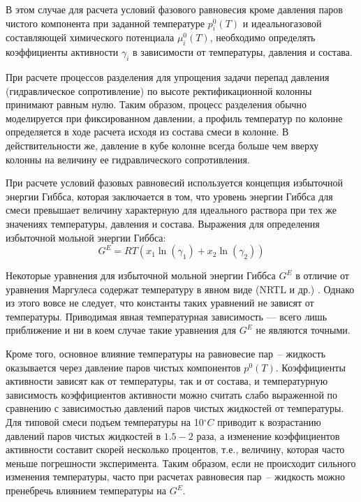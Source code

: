 В этом случае для расчета условий фазового равновесия кроме давления паров чистого компонента при заданной температуре $p_i^0(T)$ и идеальногазовой составляющей химического потенциала $\mu_i^0(T)$, необходимо определять коэффициенты активности $\gamma_i$ в зависимости от температуры, давления и состава.

При расчете процессов разделения для упрощения задачи перепад давления (гидравлическое сопротивление) по высоте ректификационной колонны принимают равным нулю. Таким образом, процесс разделения обычно моделируется при фиксированном давлении, а профиль температур по колонне определяется в ходе расчета исходя из состава смеси в колонне. В действительности же, давление в кубе колонне всегда больше чем вверху колонны на величину ее гидравлического сопротивления. 

При расчете условий фазовых равновесий используется концепция избыточной энергии Гиббса, которая заключается в том, что уровень энергии Гиббса для смеси превышает величину характерную для идеального раствора при тех же значениях температуры, давления и состава. Выражения для определения избыточной мольной энергии Гиббса:
\begin{equation}
	G^E=RT(x_1\ln (\gamma_1) +x_2 \ln(\gamma_2))
\end{equation}

Некоторые уравнения для избыточной мольной энергии Гиббса $G^E$ в отличие от уравнения Маргулеса содержат температуру в явном виде (NRTL и др.) \cite{rid1982,yelles1989}. Однако из этого вовсе не следует, что константы таких уравнений не зависят от температуры. Приводимая явная температурная зависимость --- всего лишь приближение и ни в коем случае такие уравнения для $G^E$ не являются точными.

Кроме того, основное влияние температуры на равновесие пар~-- жидкость оказывается через давление паров чистых компонентов $p^0(T)$. Коэффициенты активности зависят как от температуры, так и от состава, и температурную зависимость коэффициентов активности можно считать слабо выраженной по сравнению с зависимостью давлений паров чистых жидкостей от температуры. Для типовой смеси подъем температуры на 10$\mathrm{^\circ}C$ приводит к возрастанию давлений паров чистых жидкостей в $1.5 - 2$ раза, а изменение коэффициентов активности составит скорей несколько процентов, т.е., величину, которая часто меньше погрешности эксперимента. Таким образом, если не происходит сильного изменения температуры, часто при расчетах равновесия пар~-- жидкость можно пренебречь влиянием температуры на $G^E$.
 
